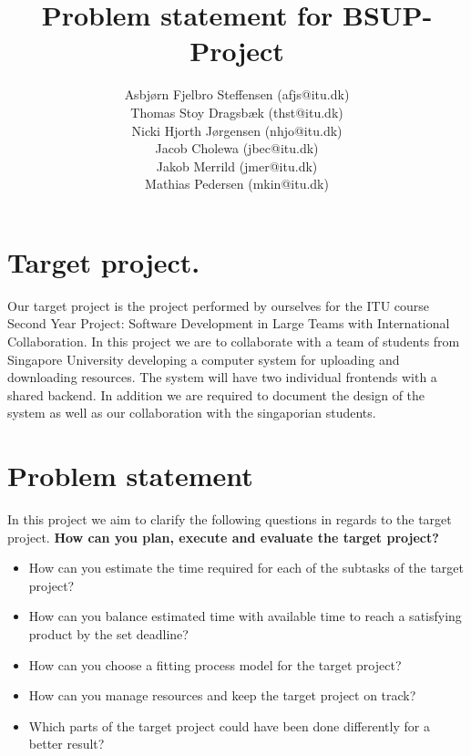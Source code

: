 \documentclass[]{article}
\title{Problem statement for BSUP-Project}
\author{Asbj\o rn Fjelbro Steffensen (afjs@itu.dk)\\ Thomas Stoy Dragsb\ae k (thst@itu.dk)\\ Nicki Hjorth J\o rgensen (nhjo@itu.dk)\\ Jacob Cholewa (jbec@itu.dk)\\ Jakob Merrild (jmer@itu.dk)\\ Mathias Pedersen (mkin@itu.dk)}
\begin{document}
\maketitle

\section*{Target project.}
Our target project is the project performed by ourselves for the ITU course 
Second Year Project: Software Development in Large Teams with International Collaboration.
In this project we are to collaborate with a team of students from Singapore University
developing a computer system for uploading and downloading resources. The system will have two
individual frontends with a shared backend. In addition we are required to document the design
of the system as well as our collaboration with the singaporian students.

\section*{Problem statement}
In this project we aim to clarify the following questions in regards to the target project.
\newline	
\textbf{How can you plan, execute and evaluate the target project?}
\begin{itemize}
	\item	How can you estimate the time required for each of the subtasks of the target project?
	\item 	How can you balance estimated time with available time to reach a satisfying product by the set deadline?
	\item 	How can you choose a fitting process model for the target project?
	\item 	How can you manage resources and keep the target project on track?
	\item 	Which parts of the target project could have been done differently for a better result?
\end{itemize}
\end{document}
